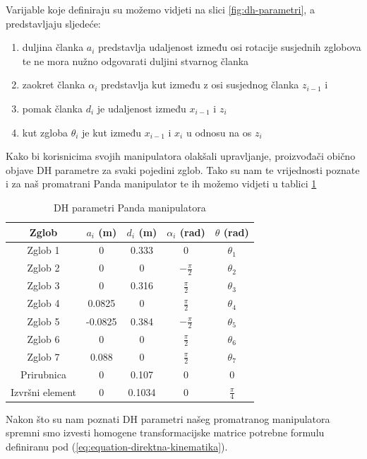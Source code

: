 \documentclass[times, utf8, diplomskirad]{fer}
\begin{document}
\noindent Varijable koje definiraju su možemo vidjeti na slici \ref{fig:dh-parametri}, a predstavljaju sljedeće:
\begin{enumerate}
    \item duljina članka \textit{$a_i$} predstavlja udaljenost između osi rotacije susjednih zglobova te ne mora nužno odgovarati duljini stvarnog članka
    \item zaokret članka \textit{$\alpha_i$} predstavlja kut između z osi susjednog članka \textit{$z_{i-1}$} i
    \item pomak članka \textit{$d_i$} je udaljenost između \textit{$x_{i-1}$} i \textit{$z_{i}$}
    \item kut zgloba \textit{$\theta_i$} je kut između \textit{$x_{i-1}$} i \textit{$x_{i}$} u odnosu na os \textit{$z_{i}$}
\end{enumerate}
Kako bi korisnicima svojih manipulatora olakšali upravljanje, proizvođači obično objave DH parametre za svaki pojedini zglob.
Tako su nam te vrijednosti poznate i za naš promatrani Panda manipulator te ih možemo vidjeti u tablici \ref{tab:dh_parameters}
\renewcommand{\arraystretch}{2}
\begin{table}[H]
\centering
\begin{tabular}{|c|c|c|c|c|}
\hline
\textbf{Zglob} & \textbf{$a_i$ (m)} & \textbf{$d_i$ (m)} & \textbf{$\alpha_i$ (rad)} & \textbf{\(\theta\) (rad)} \\
\hline
Zglob 1 & 0 & 0.333 & 0 & \(\theta_1\) \\
\hline
Zglob 2 & 0 & 0 & \(-\frac{\pi}{2}\) & \(\theta_2\) \\
\hline
Zglob 3 & 0 & 0.316 & \(\frac{\pi}{2}\) & \(\theta_3\) \\
\hline
Zglob 4 & 0.0825 & 0 & \(\frac{\pi}{2}\) & \(\theta_4\) \\
\hline
Zglob 5 & -0.0825 & 0.384 & \(-\frac{\pi}{2}\) & \(\theta_5\) \\
\hline
Zglob 6 & 0 & 0 & \(\frac{\pi}{2}\) & \(\theta_6\) \\
\hline
Zglob 7 & 0.088 & 0 & \(\frac{\pi}{2}\) & \(\theta_7\) \\
\hline
Prirubnica & 0 & 0.107 & 0 & 0 \\
\hline
Izvršni element & 0 & 0.1034 & 0 & \(\frac{\pi}{4}\) \\
\hline
\end{tabular}
\caption{DH parametri Panda manipulatora}
\label{tab:dh_parameters}
\end{table}
Nakon što su nam poznati DH parametri našeg promatranog manipulatora spremni smo izvesti homogene transformacijske matrice potrebne formulu definiranu pod (\ref{eq:equation-direktna-kinematika}).
\end{document}

